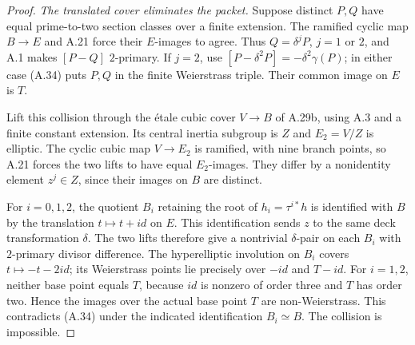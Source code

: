 \begin{proof}
\emph{The translated cover eliminates the packet.}
Suppose distinct $P,Q$ have equal prime-to-two section
classes over a finite extension. The ramified cyclic
map $B\to E$ and A.21 force their $E$-images to agree.
Thus $Q=\delta^jP$, $j=1$ or $2$, and A.1 makes
$[P-Q]$ $2$-primary. If $j=2$, use
$[P-\delta^2P]=-\delta^2\gamma(P)$; in either case
(A.34) puts $P,Q$ in the finite Weierstrass triple.
Their common image on $E$ is $T$.

Lift this collision through the \'etale cubic cover
$V\to B$ of A.29b, using A.3 and a finite constant
extension. Its central inertia subgroup is $Z$ and
$E_2=V/Z$ is elliptic. The cyclic cubic map
$V\to E_2$ is ramified, with nine branch points, so
A.21 forces the two lifts to have equal $E_2$-images.
They differ by a nonidentity element $z^j\in Z$,
since their images on $B$ are distinct.

For $i=0,1,2$, the quotient $B_i$ retaining the root
of $h_i=\tau^{i*}h$ is identified with $B$ by the
translation $t\mapsto t+id$ on $E$. This identification
sends $z$ to the same deck transformation $\delta$.
The two lifts therefore give a nontrivial $\delta$-pair
on each $B_i$ with $2$-primary divisor difference.
The hyperelliptic involution on $B_i$ covers
$t\mapsto-t-2id$; its Weierstrass points lie precisely
over $-id$ and $T-id$. For $i=1,2$, neither base point
equals $T$, because $id$ is nonzero of order three
and $T$ has order two. Hence the images over the actual
base point $T$ are non-Weierstrass. This contradicts
(A.34) under the indicated identification $B_i\simeq B$.
The collision is impossible.
\end{proof}

